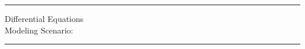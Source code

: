 
\pagestyle{empty}
\noindent\rule{7in}{0.4pt}
\begin{center}
{\sc 
\noindent Differential Equations\\
Modeling Scenario: \ModScenTitle\\
}
\end{center}
\noindent\rule{7in}{0.4pt}
